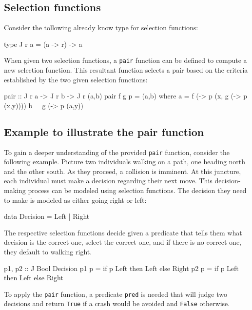 \documentclass[runningheads]{llncs}
\begin{document}
\subsection{Selection functions}\label{selection-functions}

Consider the tollowing already know type for selection functions:

\begin{code}
type J r a = (a -> r) -> a
\end{code}

When given two selection functions, a \texttt{pair} function can be
defined to compute a new selection function. This resultant function
selects a pair based on the criteria established by the two given
selection functions:

\begin{code}
pair :: J r a -> J r b -> J r (a,b)
pair f g p = (a,b)
  where
      a = f (\x -> p (x, g (\y -> p (x,y))))
      b = g (\y -> p (a,y))
\end{code}

\subsection{Example to illustrate the pair
function}\label{example-to-illustrate-the-pair-function}

To gain a deeper understanding of the provided \texttt{pair} function,
consider the following example. Picture two individuals walking on a
path, one heading north and the other south. As they proceed, a
collision is imminent. At this juncture, each individual must make a
decision regarding their next move. This decision-making process can be
modeled using selection functions. The decision they need to make is
modeled as either going right or left:

\begin{code}
data Decision = Left | Right
\end{code}

The respective selection functions decide given a predicate that tells
them what decision is the correct one, select the correct one, and if
there is no correct one, they default to walking right.

\begin{code}
p1, p2 :: J Bool Decision
p1 p = if p Left then Left else Right
p2 p = if p Left then Left else Right
\end{code}

To apply the \texttt{pair} function, a predicate \texttt{pred} is needed
that will judge two decisions and return \texttt{True} if a crash would
be avoided and \texttt{False} otherwise.
\end{document}
